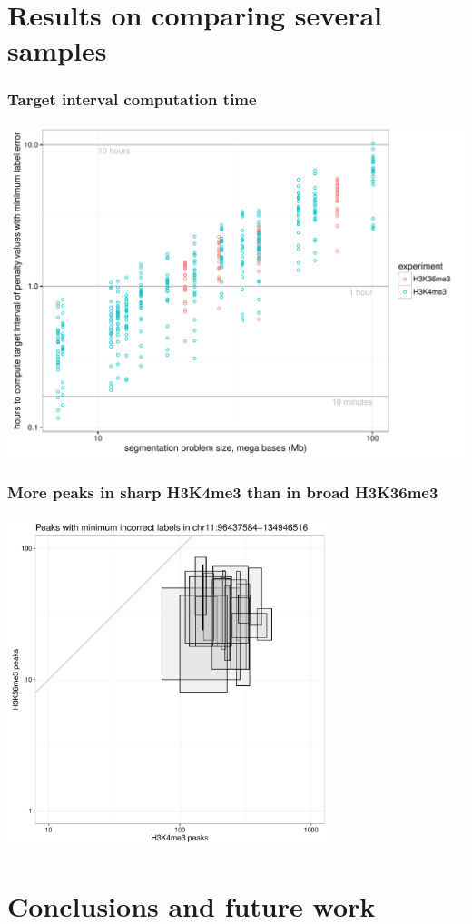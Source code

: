 \documentclass{beamer}
\begin{document}
\section{Results on comparing several samples}

\begin{frame}
  \frametitle{Target interval computation time}
  \includegraphics[width=\textwidth]{figure-target-interval-time}
\end{frame}

\begin{frame}
  \frametitle{More peaks in sharp H3K4me3 than in broad H3K36me3}
  \includegraphics[width=0.7\textwidth]{figure-min-err-peaks-compare}
\end{frame}

\section{Conclusions and future work}
\end{document}
